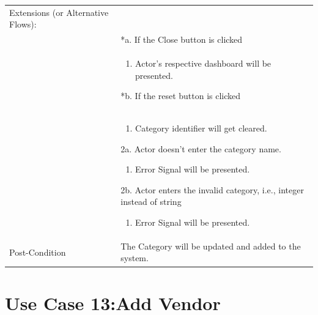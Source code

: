 \documentclass[12pt,a4paper]{article}
\begin{document}
\begin{longtable}{| p{3cm}|p{12cm}|}
Extensions (or Alternative Flows):\\
& *a. If the Close button is clicked \\
& \begin{enumerate}
		\item Actor's respective dashboard will be presented.
	\end{enumerate}
*b. If the reset button is clicked \\
&	\begin{enumerate}
		\item Category identifier will get cleared.
	\end{enumerate}
2a. Actor doesn't enter the category name.
 	\begin{enumerate}
		\item Error Signal will be presented.
	\end{enumerate}
2b. Actor enters the invalid category, i.e., integer instead of string
	\begin{enumerate}
		\item Error Signal will be presented.
	\end{enumerate}
\\ \hline
Post-Condition &    The Category will be updated and added to the system. \\ \hline

\end{longtable}

\section*{Use Case 13:Add Vendor}
\end{document}
